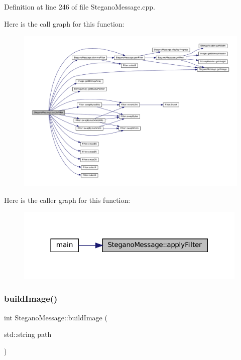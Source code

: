 Definition at line 246 of file Stegano\+Message.\+cpp.

Here is the call graph for this function\+:\nopagebreak
\begin{figure}[H]
\begin{center}
\leavevmode
\includegraphics[width=350pt]{classSteganoMessage_aec575d6949cf2eb49adefe2f1299d075_cgraph}
\end{center}
\end{figure}
Here is the caller graph for this function\+:\nopagebreak
\begin{figure}[H]
\begin{center}
\leavevmode
\includegraphics[width=314pt]{classSteganoMessage_aec575d6949cf2eb49adefe2f1299d075_icgraph}
\end{center}
\end{figure}
\mbox{\label{classSteganoMessage_ad90a4cf8cf03febfb4c3df955ccab13d}} 
\subsubsection{\texorpdfstring{buildImage()}{buildImage()}}
{\footnotesize\ttfamily int Stegano\+Message\+::build\+Image (\begin{DoxyParamCaption}\item[{std\+::string}]{path }\end{DoxyParamCaption})}



